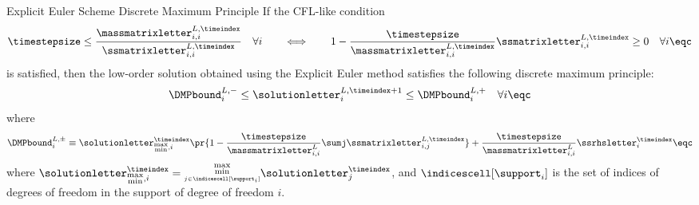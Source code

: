 \begin{theorem}{Explicit Euler Scheme Discrete
  Maximum Principle}
If the CFL-like condition
\begin{equation}\label{eq:explicit_cfl}
  \timestepsize \leq \frac{\massmatrixletter_{i,i}^{L,\timeindex}}
    {\ssmatrixletter_{i,i}^{L,\timeindex}}
  \quad\forall i
  \qquad\Longleftrightarrow\qquad
  1 - \frac{\timestepsize}{\massmatrixletter_{i,i}^{L,\timeindex}}
    \ssmatrixletter_{i,i}^{L,\timeindex}
    \geq 0\quad\forall i \eqc
\end{equation}
is satisfied, then the low-order solution obtained using the Explicit Euler
method satisfies the following discrete maximum principle:
\begin{equation}\label{eq:explicit_dmp}
   \DMPbound_i^{L,-}\leq \solutionletter_i^{L,\timeindex+1}
     \leq \DMPbound_i^{L,+}\quad\forall i
   \eqc
\end{equation}
where
\begin{equation}\label{eq:explicit_bounds}
   \DMPbound_i^{L,\pm}\equiv \solutionletter_{\substack{\max\\\min},i}^\timeindex
     \pr{1-\frac{\timestepsize}{\massmatrixletter_{i,i}^L}
       \sumj\ssmatrixletter^{L,\timeindex}_{i,j}}
     + \frac{\timestepsize}{\massmatrixletter_{i,i}^L}\ssrhsletter_i^\timeindex \eqc
\end{equation}
where $\solutionletter_{\substack{\max\\\min},i}^\timeindex =
\substack{\max\\\min\limits_{j\in\indicescell[\support_i]}}\solutionletter_j^\timeindex$,
and $\indicescell[\support_i]$ is the set of indices of degrees of freedom in the
support of degree of freedom $i$.
\end{theorem}

